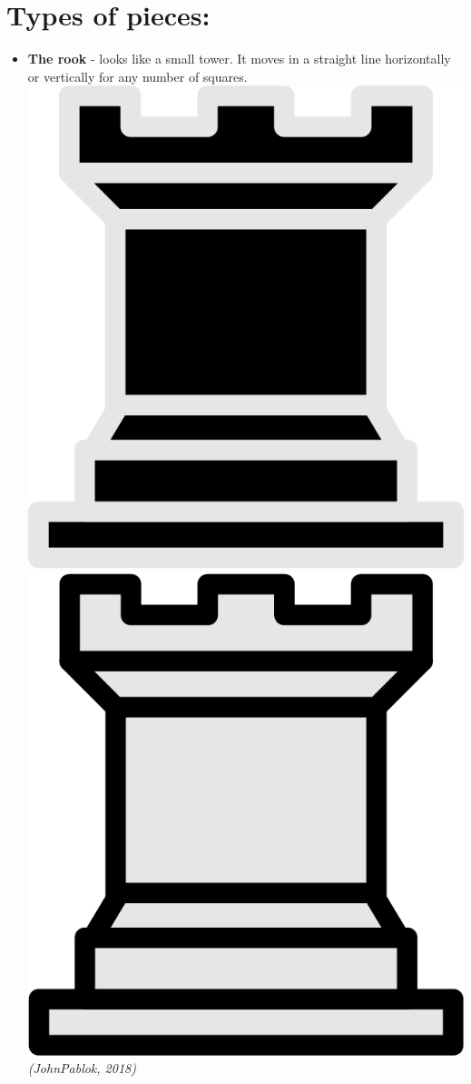\documentclass{article}
\begin{document}
\section{Types of pieces:}

\begin{itemize}
    \item \textbf{The rook} - looks like a small tower. It moves in a straight line horizontally or vertically for any number of squares. \\
    \includegraphics[scale=0.1]{image3.png}
    \includegraphics[scale=0.1]{image7.png}
    \textit{(JohnPablok, 2018)}
    

\end{itemize}
\end{document}
